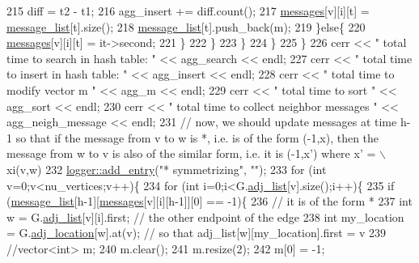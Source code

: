 \begin{DoxyCode}
215             diff = t2 - t1;
216             agg\_insert += diff.count();
217             \hyperlink{classgraph__message_aac77e098f0acf9650116a8e51fe3b4b7}{messages}[v][i][t] = \hyperlink{classgraph__message_aa17fdb629b423343edfafa97252763ef}{message\_list}[t].size();
218             \hyperlink{classgraph__message_aa17fdb629b423343edfafa97252763ef}{message\_list}[t].push\_back(m);
219           \}\textcolor{keywordflow}{else}\{
220             \hyperlink{classgraph__message_aac77e098f0acf9650116a8e51fe3b4b7}{messages}[v][i][t] = it->second;
221           \}
222         \}
223       \}
224     \}
225   \}
226   cerr << \textcolor{stringliteral}{" total time to search in hash table: "} << agg\_search << endl;
227   cerr << \textcolor{stringliteral}{" total time to insert in hash table: "} << agg\_insert << endl;
228   cerr << \textcolor{stringliteral}{" total time to modify vector m  "} << agg\_m << endl;
229   cerr << \textcolor{stringliteral}{" total time to sort  "} << agg\_sort << endl;
230   cerr << \textcolor{stringliteral}{" total time to collect neighbor messages "} <<  agg\_neigh\_message << endl;
231   \textcolor{comment}{// now, we should update messages at time h-1 so that if the message from v to w is *, i.e. is of the
       form (-1,x), then the message from w to v is also of the similar form, i.e. it is (-1,x') where x' = \(\backslash\)xi(v,w)}
232   \hyperlink{classlogger_a710163deb17bc81f70d53d285b8ac9ac}{logger::add\_entry}(\textcolor{stringliteral}{"* symmetrizing"}, \textcolor{stringliteral}{""});
233   \textcolor{keywordflow}{for} (\textcolor{keywordtype}{int} v=0;v<nu\_vertices;v++)\{
234     \textcolor{keywordflow}{for} (\textcolor{keywordtype}{int} i=0;i<G.\hyperlink{classmarked__graph_a1a0bf7ca413a278763f7c878b3b6fd6f}{adj\_list}[v].size();i++)\{
235       \textcolor{keywordflow}{if} (\hyperlink{classgraph__message_aa17fdb629b423343edfafa97252763ef}{message\_list}[h-1][\hyperlink{classgraph__message_aac77e098f0acf9650116a8e51fe3b4b7}{messages}[v][i][h-1]][0] == -1)\{
236         \textcolor{comment}{// it is of the form *}
237         \textcolor{keywordtype}{int} w = G.\hyperlink{classmarked__graph_a1a0bf7ca413a278763f7c878b3b6fd6f}{adj\_list}[v][i].first; \textcolor{comment}{// the other endpoint of the edge}
238         \textcolor{keywordtype}{int} my\_location = G.\hyperlink{classmarked__graph_a3ae722ea9583ad23af34d789a88ac01a}{adj\_location}[w].at(v); \textcolor{comment}{// so that adj\_list[w][my\_location].first =
       v}
239         \textcolor{comment}{//vector<int> m;}
240         m.clear();
241         m.resize(2);
242         m[0] = -1;

\end{DoxyCode}

